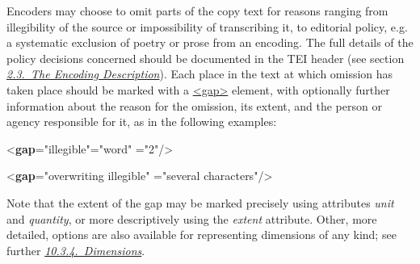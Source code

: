 Encoders may choose to omit parts of the copy text for reasons ranging from illegibility of the source or impossibility of transcribing it, to editorial policy, e.g. a systematic exclusion of poetry or prose from an encoding. The full details of the policy decisions concerned should be documented in the TEI header (see section \textit{\hyperref[HD5]{2.3.\ The Encoding Description}}). Each place in the text at which omission has taken place should be marked with a \hyperref[TEI.gap]{<gap>} element, with optionally further information about the reason for the omission, its extent, and the person or agency responsible for it, as in the following examples: \par\bgroup{}\exampleFont \begin{shaded}\noindent\mbox{}{<\textbf{gap}\hspace*{1em}{reason}="{illegible}"\hspace*{1em}{unit}="{word}"\mbox{}\newline 
\hspace*{1em}{quantity}="{2}"/>}\end{shaded}\egroup\par \noindent \par\bgroup{}\exampleFont \begin{shaded}\noindent\mbox{}{<\textbf{gap}\hspace*{1em}{reason}="{overwriting illegible}"\mbox{}\newline 
\hspace*{1em}{extent}="{several characters}"/>}\end{shaded}\egroup\par \noindent  Note that the extent of the gap may be marked precisely using attributes {\itshape unit} and {\itshape quantity}, or more descriptively using the {\itshape extent} attribute. Other, more detailed, options are also available for representing dimensions of any kind; see further \textit{\hyperref[msdim]{10.3.4.\ Dimensions}}.\par
